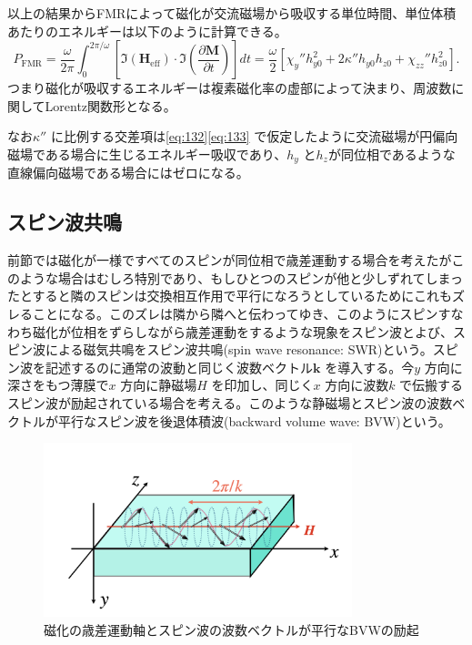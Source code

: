 \documentclass[dvipdfmx,11pt]{jsreport}
\numberwithin{equation}{chapter}
\numberwithin{table}{chapter}
\begin{document}
以上の結果からFMRによって磁化が交流磁場から吸収する単位時間、単位体積あたりのエネルギーは以下のように計算できる。
\begin{equation}
\label{eq:147}
	P_\text{FMR} =\frac{\omega}{2\pi }\int_{0}^{2\pi  /\omega}  \left[ \Im(\bm{H}_\text{eff}) \cdot \Im\left( \frac{\partial \bm{M}}{\partial t}  \right)   \right] dt=\frac{\omega}{2}\left[ \chi_{y}''h^2_{y0}+2\kappa'' h_{y0}h_{z 0}+\chi_{zz}''h^2_{z 0} \right] 
.\end{equation}
つまり磁化が吸収するエネルギーは複素磁化率の虚部によって決まり、周波数に関してLorentz関数形となる。

なお$\kappa''$ に比例する交差項は\eqref{eq:132}\eqref{eq:133}
で仮定したように交流磁場が円偏向磁場である場合に生じるエネルギー吸収であり、$h_y$ と$h_z$が同位相であるような直線偏向磁場である場合にはゼロになる。

\subsection{スピン波共鳴}
前節では磁化が一様ですべてのスピンが同位相で歳差運動する場合を考えたがこのような場合はむしろ特別であり、もしひとつのスピンが他と少しずれてしまったとすると隣のスピンは交換相互作用で平行になろうとしているためにこれもズレることになる。このズレは隣から隣へと伝わってゆき、このようにスピンすなわち磁化が位相をずらしながら歳差運動をするような現象をスピン波とよび、スピン波による磁気共鳴をスピン波共鳴(spin wave resonance: SWR)という。スピン波を記述するのに通常の波動と同じく波数ベクトル$\bm{k}$ を導入する。今$y$ 方向に深さをもつ薄膜で$x$ 方向に静磁場$H$ を印加し、同じく$x$ 方向に波数$k$ で伝搬するスピン波が励起されている場合を考える。このような静磁場とスピン波の波数ベクトルが平行なスピン波を後退体積波(backward volume wave: BVW)という。

\begin{figure}[H]
	\centering
	\includegraphics[width=0.8\textwidth]{adfig/adfig.001.jpeg}
	\caption{磁化の歳差運動軸とスピン波の波数ベクトルが平行なBVWの励起}
	\label{fig:fig-fig-011-jpeg}
\end{figure}
\end{document}
